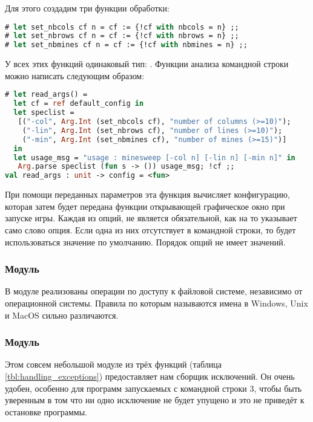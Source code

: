 Для этого создадим три функции обработки:

\begin{lstlisting}[language=OCaml]
# let set_nbcols cf n = cf := {!cf with nbcols = n} ;;
# let set_nbrows cf n = cf := {!cf with nbrows = n} ;;
# let set_nbmines cf n = cf := {!cf with nbmines = n} ;;
\end{lstlisting}

У всех этих функций одинаковый тип: . Функции 
анализа командной строки можно написать следующим образом:

\begin{lstlisting}[language=OCaml]
# let read_args() =
  let cf = ref default_config in
  let speclist = 
   [("-col", Arg.Int (set_nbcols cf), "number of columns (>=10)");
    ("-lin", Arg.Int (set_nbrows cf), "number of lines (>=10)");
    ("-min", Arg.Int (set_nbmines cf), "number of mines (>=15)")]
  in   
  let usage_msg = "usage : minesweep [-col n] [-lin n] [-min n]" in
   Arg.parse speclist (fun s -> ()) usage_msg; !cf ;;
val read_args : unit -> config = <fun>
\end{lstlisting}

При помощи переданных параметров эта функция вычисляет конфигурацию, которая 
затем будет передана функции открывающей графическое окно  при 
запуске игры. Каждая из опций, не является обязательной, как на то указывает 
само слово опция. Если одна из них отсутствует в командной строки, то будет 
использоваться значение по умолчанию. Порядок опций не имеет значений.

\subsubsection{Модуль }
\label{subsubsec:module_filename}

В модуле  реализованы операции по доступу к файловой системе, 
независимо от операционной системы. Правила по которым называются имена в 
Windows, Unix и MacOS сильно различаются.

\subsubsection{Модуль }
\label{subsubsec:module_printexc}

Этом совсем небольшой модуле из трёх функций (таблица 
\ref{tbl:handling_exceptions}) предоставляет нам сборщик исключений. Он очень 
удобен, особенно для программ запускаемых с командной строки 3, чтобы быть 
уверенным в том что ни одно исключение не будет упущено и это не приведёт к 
остановке программы.

